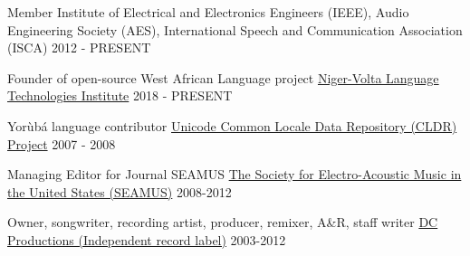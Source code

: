 

\begin{cventries}
	
  \cventry
    {Member} %
    {Institute of Electrical and Electronics Engineers (IEEE), Audio Engineering Society (AES), International Speech and Communication Association (ISCA)} %
    {} %
    {2012 - PRESENT} %
    {}

  \cventry
    {Founder of open-source West African Language project} %
    {\href{https://github.com/Niger-Volta-LTI}{Niger-Volta Language Technologies Institute}} %
    {} %
    {2018 - PRESENT} %
    {}

  \cventry
    {Yor{\`u}b{\'a} language contributor} %
    {\href{http://cldr.unicode.org}{Unicode Common Locale Data Repository (CLDR) Project}} %
    {} %
    {2007 - 2008} %
    {}

  \cventry
    {Managing Editor for Journal SEAMUS} %
    {\href{https://www.seamusonline.org}{The Society for Electro-Acoustic Music in the United States (SEAMUS)}} %
    {} %
    {2008-2012} %
    {}
    
  \cventry
    {Owner, songwriter, recording artist, producer, remixer, A\&R, staff writer} %
    {\href{http://www.discogs.com/label/43535-Defchild-Productions}{DC Productions (Independent record label)}} %
    {} %
    {2003-2012} %
    {}
	
\end{cventries}
